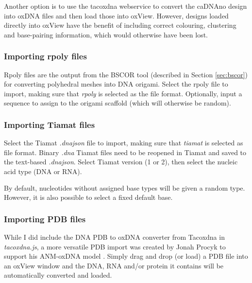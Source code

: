 Another option is to use the tacoxdna webservice to convert the caDNAno design into oxDNA files and then load those into oxView. However, designs loaded directly into oxView have the benefit of including correct colouring, clustering and base-pairing information, which would otherwise have been lost.

\subsubsection{Importing rpoly files}
Rpoly files are the output from the BSCOR \cite{vHelix} tool (described in Section \ref{sec:bscor}) for converting polyhedral meshes into DNA origami.
Select the rpoly file to import, making sure that \emph{rpoly} is selected as the file format. Optionally, input a sequence to assign to the origami scaffold (which will otherwise be random).

\subsubsection{Importing Tiamat files}
Select the Tiamat \emph{.dnajson} file to import, making sure that \emph{tiamat} is selected as file format. Binary \emph{.dna} Tiamat files need to be reopened in Tiamat and saved to the text-based \emph{.dnajson}. Select Tiamat version (1 or 2), then select the nucleic acid type (DNA or RNA).

By default, nucleotides without assigned base types will be given a random type. However, it is also possible to select a fixed default base.

\subsubsection{Importing PDB files}
While I did include the DNA PDB to oxDNA converter from Tacoxdna in \emph{tacoxdna.js}, a more versatile PDB import was created by Jonah Procyk to support his ANM-oxDNA model \cite{procyk2021coarse}. Simply drag and drop (or load) a PDB file into an oxView window and the DNA, RNA and/or protein it contains will be automatically converted and loaded.


